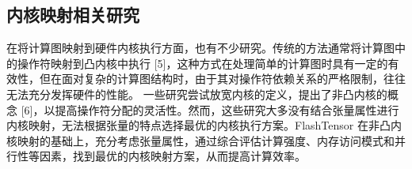 \subsection{内核映射相关研究}
在将计算图映射到硬件内核执行方面，也有不少研究。传统的方法通常将计算图中的操作符映射到凸内核中执行 [5]，这种方式在处理简单的计算图时具有一定的有效性，但在面对复杂的计算图结构时，由于其对操作符依赖关系的严格限制，往往无法充分发挥硬件的性能。
一些研究尝试放宽内核的定义，提出了非凸内核的概念 [6]，以提高操作符分配的灵活性。然而，这些研究大多没有结合张量属性进行内核映射，无法根据张量的特点选择最优的内核执行方案。FlashTensor 在非凸内核映射的基础上，充分考虑张量属性，通过综合评估计算强度、内存访问模式和并行性等因素，找到最优的内核映射方案，从而提高计算效率。
